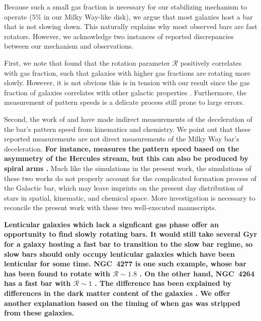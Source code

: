 \documentclass[twocolumn,linenumbers,trackchanges]{aastex631}
\newcommand{\Rot}{\ensuremath{\mathcal{R}}}
\begin{document}
Because such a small gas fraction is necessary for our stabilizing mechanism to
operate ($5\%$ in our Milky Way-like disk), we argue that most galaxies host a
bar that is not slowing down. This naturally explains why most observed bars are
fast rotators. However, we acknowledge two instances of reported discrepancies
between our mechanism and observations.

First, we note that \citet{2020MNRAS.491.3655G} found that the rotation
parameter \Rot{} positively correlates with gas fraction, such that galaxies
with higher gas fractions are rotating more slowly. However, it is not obvious
this is in tension with our result since the gas fraction of galaxies correlates
with other galactic properties \citep{2009ARAA..47..159B}. Furthermore, the
measurement of pattern speeds is a delicate process still prone to large errors.

Second, the work of \citet{2021MNRAS.500.4710C} and \citet{2021MNRAS.505.2412C}
have made indirect measurements of the deceleration of the bar's pattern speed
from kinematics and chemistry. We point out that these reported measurements are
not direct measurements of the Milky Way bar's deceleration. {\bf For instance,
\citet{2021MNRAS.500.4710C} measures the pattern speed based on the asymmetry of
the Hercules stream, but this can also be produced by spiral arms
\citep{2018MNRAS.481.3794H}.} Much like the simulations in the present work, the
simulations of these two works do not properly account for the complicated
formation process of the Galactic bar, which may leave imprints on the present
day distribution of stars in spatial, kinematic, and chemical space. More
investigation is necessary to reconcile the present work with these two
well-executed manuscripts.

{\bf Lenticular galaxies which lack a signficant gas phase offer an opportunity
to find slowly rotating bars. It would still take several Gyr for a galaxy
hosting a fast bar to transition to the slow bar regime, so slow bars should
only occupy lenticular galaxies which have been lenticular for some time.
NGC~4277 is one such example, whose bar has been found to rotate with
$\Rot{}\sim1.8$ \citep{2022AA...664L..10B}. On the other hand, NGC~4264 has a
fast bar with $\Rot{}\sim1$ \citep{2019MNRAS.488.4972C}. The difference has been
explained by differences in the dark matter content of the galaxies
\citep{2023MNRAS.521.2227B}. We offer another explanation based on the timing of
when gas was stripped from these galaxies.}
\end{document}
